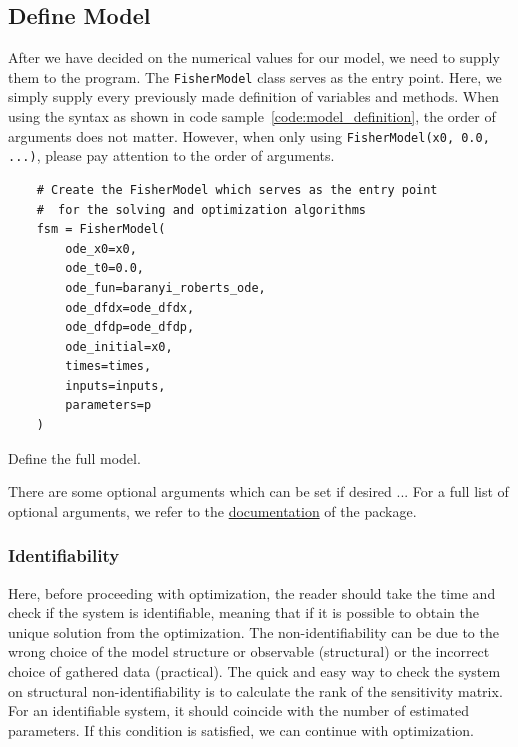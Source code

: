 \documentclass[10pt,A4paper]{article}
\begin{document}
\subsection*{Define Model}
After we have decided on the numerical values for our model, we need to supply them to the program.
The \texttt{FisherModel} class serves as the entry point.
Here, we simply supply every previously made definition of variables and methods.
When using the syntax as shown in code sample~\ref{code:model_definition}, the order of arguments does not matter.
However, when only using \texttt{FisherModel(x0, 0.0, ...)}, please pay attention to the order of arguments.
\begin{code}[H]
    \begin{verbatim}
    # Create the FisherModel which serves as the entry point
    #  for the solving and optimization algorithms
    fsm = FisherModel(
        ode_x0=x0,
        ode_t0=0.0,
        ode_fun=baranyi_roberts_ode,
        ode_dfdx=ode_dfdx,
        ode_dfdp=ode_dfdp,
        ode_initial=x0,
        times=times,
        inputs=inputs,
        parameters=p
    )
    \end{verbatim}
    \caption{Define the full model.}
    \label{code:model_definition}
\end{code}
There are some optional arguments which can be set if desired ...
For a full list of optional arguments, we refer to the \href{https://spatial-systems-biology-freiburg.github.io/FisInMa/}{documentation} of the package.
%
\subsubsection*{Identifiability}
Here, before proceeding with optimization, the reader should take the time and check if the system is identifiable, meaning that if it is possible to obtain the unique solution from the optimization. 
The non-identifiability can be due to the wrong choice of the model structure or observable (structural) or the incorrect choice of gathered data (practical).
The quick and easy way to check the system on structural non-identifiability is to calculate the rank of the sensitivity matrix.
For an identifiable system, it should coincide with the number of estimated parameters.
If this condition is satisfied, we can continue with optimization.
%
\end{document}
